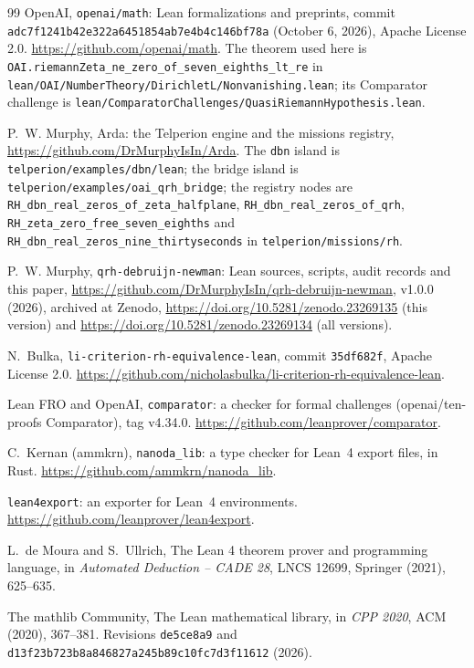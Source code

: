 \documentclass[11pt]{article}
\theoremstyle{definition}
\begin{document}
\begin{thebibliography}{99}
 OpenAI, \texttt{openai/math}: Lean formalizations and preprints, commit \texttt{adc7f1241b42e322a6451854ab7e4b4c146bf78a} (October 6, 2026), Apache License 2.0. \url{https://github.com/openai/math}. The theorem used here is \texttt{OAI.riemannZeta\_ne\_zero\_of\_seven\_eighths\_lt\_re} in \texttt{lean/OAI/NumberTheory/DirichletL/Nonvanishing.lean}; its Comparator challenge is \texttt{lean/ComparatorChallenges/QuasiRiemannHypothesis.lean}.

 P.~W. Murphy, Arda: the Telperion engine and the missions registry, \url{https://github.com/DrMurphyIsIn/Arda}. The \texttt{dbn} island is \texttt{telperion/examples/dbn/lean}; the bridge island is \texttt{telperion/examples/oai\_qrh\_bridge}; the registry nodes are \texttt{RH\_dbn\_real\_zeros\_of\_zeta\_halfplane}, \texttt{RH\_dbn\_real\_zeros\_of\_qrh}, \texttt{RH\_zeta\_zero\_free\_seven\_eighths} and \texttt{RH\_dbn\_real\_zeros\_nine\_thirtyseconds} in \texttt{telperion/missions/rh}.

 P.~W. Murphy, \texttt{qrh-debruijn-newman}: Lean sources, scripts, audit records and this paper, \url{https://github.com/DrMurphyIsIn/qrh-debruijn-newman}, v1.0.0 (2026), archived at Zenodo, \url{https://doi.org/10.5281/zenodo.23269135} (this version) and \url{https://doi.org/10.5281/zenodo.23269134} (all versions).

 N.~Bulka, \texttt{li-criterion-rh-equivalence-lean}, commit \texttt{35df682f}, Apache License 2.0. \url{https://github.com/nicholasbulka/li-criterion-rh-equivalence-lean}.

 Lean FRO and OpenAI, \texttt{comparator}: a checker for formal challenges (openai/ten-proofs Comparator), tag v4.34.0. \url{https://github.com/leanprover/comparator}.

 C.~Kernan (ammkrn), \texttt{nanoda\_lib}: a type checker for Lean~4 export files, in Rust. \url{https://github.com/ammkrn/nanoda_lib}.

 \texttt{lean4export}: an exporter for Lean~4 environments. \url{https://github.com/leanprover/lean4export}.

 L.~de Moura and S.~Ullrich, The Lean 4 theorem prover and programming language, in \emph{Automated Deduction -- CADE 28}, LNCS 12699, Springer (2021), 625--635.

 The mathlib Community, The Lean mathematical library, in \emph{CPP 2020}, ACM (2020), 367--381. Revisions \texttt{de5ce8a9} and \texttt{d13f23b723b8a846827a245b89c10fc7d3f11612} (2026).

\end{thebibliography}
\end{document}
